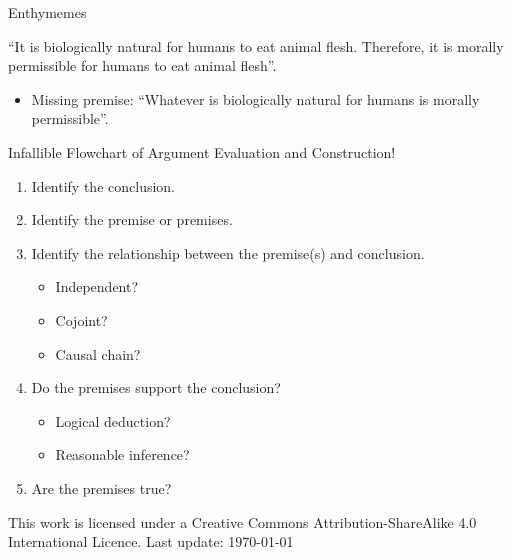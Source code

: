 \documentclass{beamer}
\begin{document}




\begin{frame}{Enthymemes}

``It is biologically natural for humans to eat animal flesh. Therefore, it is morally permissible for humans to eat animal flesh''.

\begin{itemize}
\item Missing premise: ``Whatever is biologically natural for humans is morally permissible''.
\end{itemize}

\end{frame}



\begin{frame}{Infallible Flowchart of Argument Evaluation and Construction!}
\begin{enumerate}
\item Identify the conclusion.
\item Identify the premise or premises.
\item Identify the relationship between the premise(s) and conclusion.
\begin{itemize}
\item Independent?
\item Cojoint?
\item Causal chain?
\end{itemize}
\item Do the premises support the conclusion?
\begin{itemize}
\item Logical deduction?
\item Reasonable inference?
\end{itemize}
\item Are the premises true?
\end{enumerate}

\vspace{12pt}

\tiny
This work is licensed under a Creative Commons Attribution-ShareAlike
4.0 International Licence. Last update: \today

\end{frame}
\end{document}
